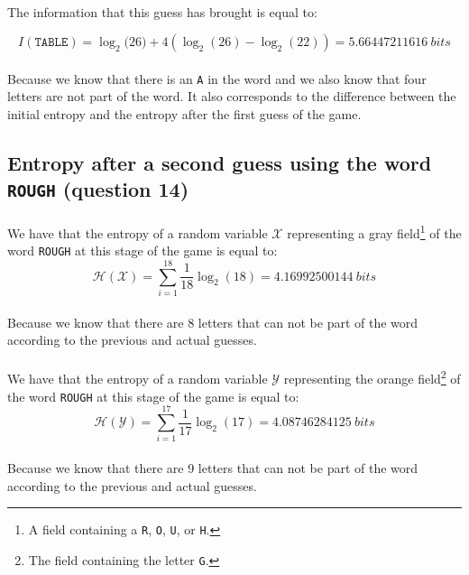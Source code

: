 \documentclass[a4paper, 11pt, oneside]{article}
\begin{document}
\paragraph{}The information that this guess has brought is equal to:

$$I(\texttt{TABLE}) = \log_2{(26}) + 4 \left(\log_2{(26)} - \log_2(22)\right) = 5.66447211616 \ bits$$

\paragraph{}Because we know that there is an \texttt{A} in the word and we also know that four letters are not part of the word. It also corresponds to the difference between the initial entropy and the entropy after the first guess of the game. 

\subsection{Entropy after a second guess using the word \texttt{ROUGH} (question 14)}

\paragraph{}We have that the entropy of a random variable $\mathcal{X}$ representing a gray field\footnote{A field containing a \texttt{R}, \texttt{O}, \texttt{U}, or \texttt{H}.} of the word \texttt{ROUGH} at this stage of the game is equal to:
$$ \mathcal{H}(\mathcal{X}) = \sum_{i=1}^{18} \frac{1}{18} \log_2{(18)} = 4.16992500144\ bits $$
\paragraph{}Because we know that there are 8 letters that can not be part of the word according to the previous and actual guesses.

\paragraph{}We have that the entropy of a random variable  $\mathcal{Y}$ representing the orange field\footnote{The field containing the letter \texttt{G}.} of the word \texttt{ROUGH} at this stage of the game is equal to:
$$ \mathcal{H}(\mathcal{Y}) = \sum_{i=1}^{17} \frac{1}{17} \log_2{(17)} = 4.08746284125 \ bits $$
\paragraph{}Because we know that there are 9 letters that can not be part of the word according to the previous and actual guesses.
\end{document}
